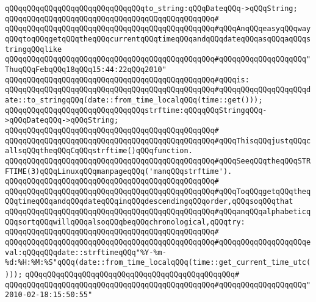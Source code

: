\newline
\newline
\verb|qQQqqQQqqQQqqQQqqQQqqQQqqQQqqQQqto_string:qQQqDateqQQq->qQQqString;|\newline
\verb|qQQqqQQqqQQqqQQqqQQqqQQqqQQqqQQqqQQqqQQqqQQqqQQq#|\newline
\verb|qQQqqQQqqQQqqQQqqQQqqQQqqQQqqQQqqQQqqQQqqQQqqQQq#qQQqAnqQQqeasyqQQqwayqQQqtoqQQqgetqQQqtheqQQqcurrentqQQqtimeqQQqandqQQqdateqQQqasqQQqaqQQqstringqQQqlike|\newline
\verb|qQQqqQQqqQQqqQQqqQQqqQQqqQQqqQQqqQQqqQQqqQQqqQQq#qQQqqQQqqQQqqQQqqQQq"ThuqQQqFebqQQq18qQQq15:44:22qQQq2010"|\newline
\verb|qQQqqQQqqQQqqQQqqQQqqQQqqQQqqQQqqQQqqQQqqQQqqQQq#qQQqis:|\newline
\verb|qQQqqQQqqQQqqQQqqQQqqQQqqQQqqQQqqQQqqQQqqQQqqQQq#qQQqqQQqqQQqqQQqqQQqdate::to_stringqQQq(date::from_time_localqQQq(time::get()));|\newline
\newline
\verb|qQQqqQQqqQQqqQQqqQQqqQQqqQQqqQQqstrftime:qQQqqQQqStringqQQq->qQQqDateqQQq->qQQqString;|\newline
\verb|qQQqqQQqqQQqqQQqqQQqqQQqqQQqqQQqqQQqqQQqqQQqqQQq#|\newline
\verb|qQQqqQQqqQQqqQQqqQQqqQQqqQQqqQQqqQQqqQQqqQQqqQQq#qQQqThisqQQqjustqQQqcallsqQQqtheqQQqCqQQqstrftime()qQQqfunction.|\newline
\verb|qQQqqQQqqQQqqQQqqQQqqQQqqQQqqQQqqQQqqQQqqQQqqQQq#qQQqSeeqQQqtheqQQqSTRFTIME(3)qQQqLinuxqQQqmanpageqQQq('manqQQqstrftime').|\newline
\verb|qQQqqQQqqQQqqQQqqQQqqQQqqQQqqQQqqQQqqQQqqQQqqQQq#|\newline
\verb|qQQqqQQqqQQqqQQqqQQqqQQqqQQqqQQqqQQqqQQqqQQqqQQq#qQQqToqQQqgetqQQqtheqQQqtimeqQQqandqQQqdateqQQqinqQQqdescendingqQQqorder,qQQqsoqQQqthat|\newline
\verb|qQQqqQQqqQQqqQQqqQQqqQQqqQQqqQQqqQQqqQQqqQQqqQQq#qQQqanqQQqalphabeticqQQqsortqQQqwillqQQqalsoqQQqbeqQQqchronological,qQQqtry:|\newline
\verb|qQQqqQQqqQQqqQQqqQQqqQQqqQQqqQQqqQQqqQQqqQQqqQQq#|\newline
\verb|qQQqqQQqqQQqqQQqqQQqqQQqqQQqqQQqqQQqqQQqqQQqqQQq#qQQqqQQqqQQqqQQqqQQqeval:qQQqqQQqdate::strftimeqQQq"%Y-%m-%d:%H:%M:%S"qQQq(date::from_time_localqQQq(time::get_current_time_utc()));|\newline
\verb|qQQqqQQqqQQqqQQqqQQqqQQqqQQqqQQqqQQqqQQqqQQqqQQq#|\newline
\verb|qQQqqQQqqQQqqQQqqQQqqQQqqQQqqQQqqQQqqQQqqQQqqQQq#qQQqqQQqqQQqqQQqqQQq"2010-02-18:15:50:55"|\newline
